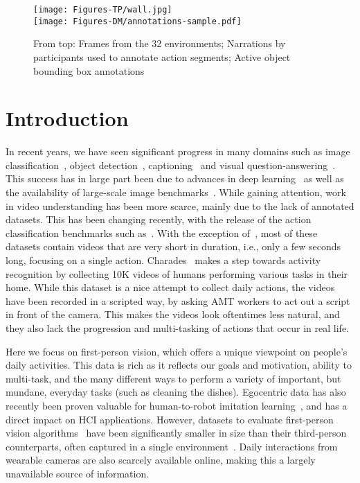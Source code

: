 \documentclass[runningheads]{llncs}
\begin{document}
\begin{figure}[t]
\centering
\texttt{[image: Figures-TP/wall.jpg]}\\\vspace*{6pt}
\texttt{[image: Figures-DM/annotations-sample.pdf]}
\caption{From top: Frames from the 32 environments; Narrations by participants used to annotate action segments; Active object bounding box annotations}
\label{fig:epic-wall}
\end{figure}


\vspace*{-20pt}
\section{Introduction}\label{sec:introduction}



In recent years, we have seen significant progress in many domains such as image classification~\cite{resnet}, object detection~\cite{ren2015faster}, captioning~\cite{Karpathy14} and visual question-answering~\cite{VQA}. This success has in large part been due to advances in deep learning~\cite{alexnet} as well as the availability of large-scale image benchmarks~\cite{pascal,imagenet,coco,ade}. 
While gaining attention, work in video understanding has been more scarce, mainly due to the lack of annotated datasets. This has been changing recently, with the release of the action classification benchmarks such as~\cite{Goyal2017,Haija2016,zhao2017slac,moviedescription,movieqa,fouhey2017lifestyle}. With the exception of~\cite{movieqa}, most of these datasets contain videos that are very short in duration, i.e., only a few seconds long, focusing on a single action. Charades~\cite{Sigurdsson2016} makes a step towards activity recognition by collecting 10K videos of humans performing various tasks in their home. While this dataset is a nice attempt to collect daily actions, the videos have been recorded in a scripted way, by asking AMT workers to act out a script in front of the camera. This makes the videos look oftentimes less natural, and they also lack the progression and multi-tasking of actions that occur in real life. 

Here we focus on first-person vision, which offers a unique viewpoint on people's daily activities. This data is rich as it reflects our goals and motivation, ability to multi-task, and the many different ways to perform a variety of important, but mundane, everyday tasks (such as cleaning the dishes). 
Egocentric data has also recently been proven valuable for human-to-robot imitation learning~\cite{Nair2017,Zhang2018}, and has a direct impact on HCI applications. However, datasets to evaluate first-person vision algorithms~\cite{EGTEA,sigurdsson2018charadesego,Damen2014a,Fathi2012,Pirsiavash2012,de2008guide} have been significantly smaller in size than their third-person counterparts, often captured in a single environment~\cite{EGTEA,Damen2014a,Fathi2012,de2008guide}.
Daily interactions from wearable cameras are also scarcely available online, making this a largely unavailable source of information. 
\end{document}
